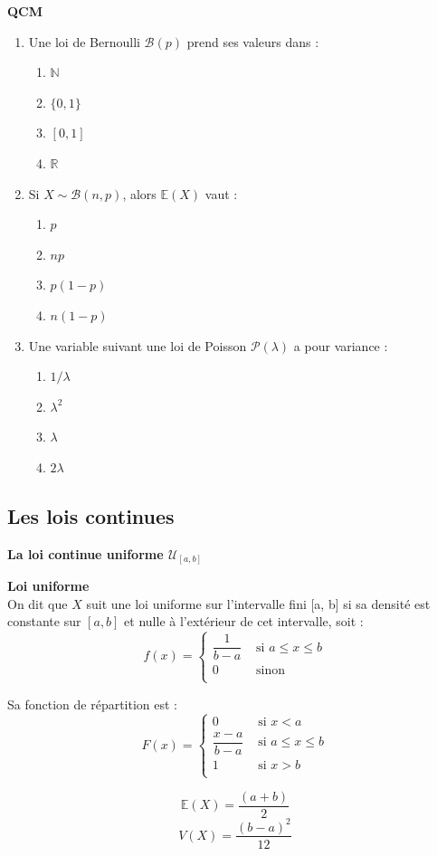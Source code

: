 \documentclass[../PolyS4.tex]{subfiles}
\begin{document}
\newpage
\textbf{QCM}

\begin{enumerate}
\item Une loi de Bernoulli $\mathcal B(p)$ prend ses valeurs dans :
\begin{enumerate}
\item $\mathbb N$
\item $\{0,1\}$
\item $[0,1]$
\item $\mathbb R$
\end{enumerate}

\item Si $X\sim\mathcal B(n,p)$, alors $\mathbb E(X)$ vaut :
\begin{enumerate}
\item $p$
\item $np$
\item $p(1-p)$
\item $n(1-p)$
\end{enumerate}

\item Une variable suivant une loi de Poisson $\mathcal P(\lambda)$ a pour variance :
\begin{enumerate}
\item $1/\lambda$
\item $\lambda^2$
\item $\lambda$
\item $2\lambda$
\end{enumerate}
\end{enumerate}


\subsection{Les lois continues}
\textbf{ La loi continue uniforme $\mathcal{U}_{[a,b]}$}

\begin{Def}\textbf{Loi uniforme}\\
On dit que $X$ suit une loi uniforme sur l'intervalle fini [a, b] si sa densité
est constante sur $[a, b]$ et nulle à l'extérieur de cet intervalle, soit :
$$f(x) =
\left\{
\begin{array}{ll}
\dfrac{1}{b-a}& \text{ si } a \leq  x \leq b\\
0& \text{ sinon }\\
\end{array}
\right.$$

Sa fonction de répartition est :
$$F(x) =
\left\{
\begin{array}{ll}
0& \text{ si } x<a\\
\dfrac{x-a}{b-a}& \text{ si } a \leq  x \leq b\\
1& \text{ si } x>b\\
\end{array}
\right.$$


$$\mathbb E(X) =\dfrac{(a+b)}{2}$$
$$V (X) =\dfrac{(b-a)^2}{12}$$
\end{Def}
\end{document}
